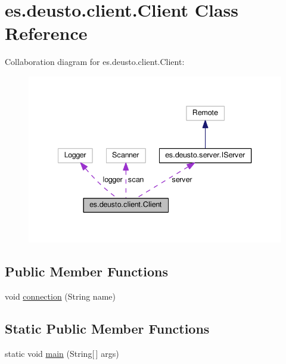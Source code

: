 \hypertarget{classes_1_1deusto_1_1client_1_1_client}{}\section{es.\+deusto.\+client.\+Client Class Reference}
\label{classes_1_1deusto_1_1client_1_1_client}


Collaboration diagram for es.\+deusto.\+client.\+Client\+:\nopagebreak
\begin{figure}[H]
\begin{center}
\leavevmode
\includegraphics[width=340pt]{classes_1_1deusto_1_1client_1_1_client__coll__graph}
\end{center}
\end{figure}
\subsection*{Public Member Functions}
\begin{DoxyCompactItemize}
\item 
void \hyperlink{classes_1_1deusto_1_1client_1_1_client_a7a7fe3b9a2360883bd7697efe69816dc}{connection} (String name)
\end{DoxyCompactItemize}
\subsection*{Static Public Member Functions}
\begin{DoxyCompactItemize}
\item 
static void \hyperlink{classes_1_1deusto_1_1client_1_1_client_a69a7526d0af9cb2341f4bf341b501152}{main} (String\mbox{[}$\,$\mbox{]} args)
\end{DoxyCompactItemize}
